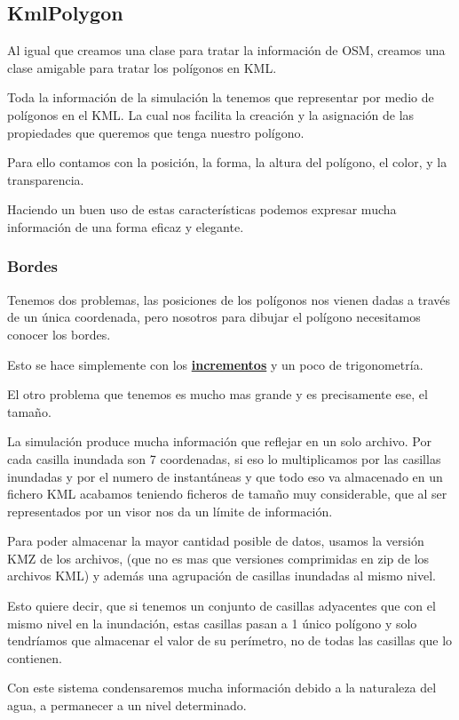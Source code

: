 \subsection*{KmlPolygon}
Al igual que creamos una clase para tratar la información de OSM, creamos una
clase amigable para tratar los polígonos en KML.

Toda la información de la simulación la tenemos que representar por medio de
polígonos en el KML. La cual nos facilita la creación y la asignación de las
propiedades que queremos que tenga nuestro polígono.

Para ello contamos con la posición, la forma, la altura del polígono, el color,
y la transparencia.

Haciendo un buen uso de estas características podemos expresar mucha
información de una forma eficaz y elegante.
\subsubsection*{Bordes}
Tenemos dos problemas, las posiciones de los polígonos nos vienen dadas a
través de un única coordenada, pero nosotros para dibujar el polígono
necesitamos conocer los bordes.

Esto se hace simplemente con los \hyperref[incrementos]{\bf incrementos} y un
poco de trigonometría.

El otro problema que tenemos es mucho mas grande y es precisamente ese, el
tamaño.

La simulación produce mucha información que reflejar en un solo archivo. Por
cada casilla inundada son 7 coordenadas, si eso lo multiplicamos por las
casillas inundadas y por el numero de instantáneas y que todo eso va almacenado
en un fichero KML acabamos teniendo ficheros de tamaño muy considerable, que al
ser representados por un visor nos da un límite de información.

Para poder almacenar la mayor cantidad posible de datos, usamos la versión KMZ
de los archivos, (que no es mas que versiones comprimidas en zip de los
archivos KML) y además una agrupación de casillas inundadas al mismo nivel.

Esto quiere decir, que si tenemos un conjunto de casillas adyacentes que con el
mismo nivel en la inundación, estas casillas pasan a 1 único polígono y solo
tendríamos que almacenar el valor de su perímetro, no de todas las casillas que
lo contienen.

Con este sistema condensaremos mucha información debido a la naturaleza del
agua, a permanecer a un nivel determinado.

